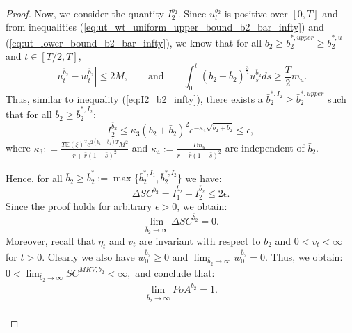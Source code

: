 \documentclass[11pt]{article}
\begin{document}
\begin{proof}
	Now, we consider the quantity $I^{\bar{b}_2}_2$. Since $u_t^{\bar{b}_2}$ is positive over $[0,T]$ and from inequalities (\ref{eq:ut_wt_uniform_upper_bound_b2_bar_infty}) and (\ref{eq:ut_lower_bound_b2_bar_infty}), we know that for all $\bar{b}_2 \geq \bar{b}_2^{*,upper} \geq \bar{b}_2^{*,u}$ and $t \in [T/2,T]$,
	\begin{equation*}
	\left\vert u_t^{\bar{b}_2} - w_t^{\bar{b}_2} \right\vert \leq 2M,\qquad \text{and} \qquad \int_0^t (b_2 + \bar{b}_2)^{\frac{3}{2}} u_s^{\bar{b}_2} ds \geq \frac{T}{2}m_u.
	\end{equation*}
	Thus, similar to inequality (\ref{eq:I2_b2_infty}), there exists a $\bar{b}_2^{*,I_2} \geq \bar{b}_2^{*,upper}$ such that for all $\bar{b}_2 \geq \bar{b}_2^{*,I_2}$:
	\begin{equation*}
	I^{\bar{b}_2}_2  \leq  \kappa_3 (b_2 + \bar{b}_2)^2 e^{ - \kappa_4 \sqrt{b_2 + \bar{b}_2} } \leq \epsilon,
	\end{equation*}
	where  $\kappa_3: =\frac{T \mathbb{E}(\xi)^2 e^{2 (b_1 + \bar{b}_1) T} M^2 }{r + \bar{r}(1-\bar{s})^2}$ and $\kappa_4 := \frac{T m_u}{r + \bar{r}(1-\bar{s})^2}$ are independent of $\bar{b}_2$.
	
	Hence, for all $\bar{b}_2 \geq \bar{b}_2^* := \max \{ \bar{b}_2^{*,I_1}, \bar{b}_2^{*,I_2}\}$ we have:
	\begin{equation*}
	\Delta SC^{\bar{b}_2} = I^{\bar{b}_2}_1 + I^{\bar{b}_2}_2 \leq 2\epsilon.
	\end{equation*} 
	Since the proof holds for arbitrary $\epsilon > 0$, we obtain:
	\begin{equation*}
	\lim_{\bar{b}_2 \to \infty} \Delta SC^{\bar{b}_2} = 0.
	\end{equation*}
	Moreover, recall that $\eta_t$ and $v_t$ are invariant with respect to $\bar{b}_2$ and $0<v_t<\infty$ for $t>0$. Clearly we also have $w^{\bar{b}_2}_0 \geq 0$ and $\lim_{\bar{b}_2 \to \infty}w^{\bar{b}_2}_0 = 0$. Thus, we obtain:
	$0< \lim_{\bar{b}_2 \to \infty} SC^{MKV,\bar{b}_2} <\infty,$
	and conclude that:
	$$ \lim_{\bar{b}_2 \to \infty} PoA^{\bar{b}_2} = 1.$$\\
	

\end{proof}
\end{document}
